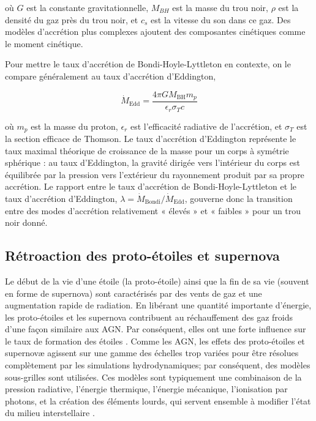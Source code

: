 \documentclass{article}
\begin{document}
où $G$ est la constante gravitationnelle, $M_{BH}$ est la masse du trou noir, $\rho$ est la densité du gaz près du trou noir, et $c_s$ est la vitesse du son dans ce gaz. Des modèles d’accrétion plus complexes ajoutent des composantes cinétiques comme le moment cinétique.

Pour mettre le taux d’accrétion de Bondi-Hoyle-Lyttleton en contexte, on le compare généralement au taux d’accrétion d’Eddington,

\begin{equation}
\dot M_{\text{Edd}} = \frac{4 \pi G M_{\text{BH}} m_p}{\epsilon_r \sigma_T c}
\end{equation}

où $m_p$ est la masse du proton, $\epsilon_r$ est l’efficacité radiative de l’accrétion, et $\sigma_T$ est la section efficace de Thomson. Le taux d’accrétion d’Eddington représente le taux maximal théorique de croissance de la masse pour un corps à symétrie sphérique : au taux d’Eddington, la gravité dirigée vers l’intérieur du corps est équilibrée par la pression vers l’extérieur du rayonnement produit par sa propre accrétion. Le rapport entre le taux d’accrétion de Bondi-Hoyle-Lyttleton et le taux d’accrétion d’Eddington, $\lambda = \dot M_{\text{Bondi}} /\dot M_{\text{Edd}}$, gouverne donc la transition entre des modes d’accrétion relativement « élevés » et « faibles » pour un trou noir donné.

\subsection{Rétroaction des proto-étoiles et supernova}

Le début de la vie d'une étoile (la proto-étoile) ainsi que la fin de sa vie (souvent en forme de supernova) sont caractérisés par des vents de gaz et une augmentation rapide de radiation. En libérant une quantité importante d'énergie, les proto-étoiles et les supernova contribuent au réchauffement des gaz froids d'une façon similaire aux AGN. Par conséquent, elles ont une forte influence sur le taux de formation des étoiles \citep[par ex.,][]{Yepes_1997, FIRE_feedback}. Comme les AGN, les effets des proto-étoiles et supernovæ agissent sur une gamme des échelles trop variées pour être résolues complètement par les simulations hydrodynamiques; par conséquent, des modèles sous-grilles sont utilisées. Ces modèles sont typiquement une combinaison de la pression radiative, l’énergie thermique, l’énergie mécanique, l'ionisation par photons, et la création des éléments lourds, qui servent ensemble à modifier l’état du milieu interstellaire \citep[par ex.,][]{FIRE_sim}. 
\end{document}
